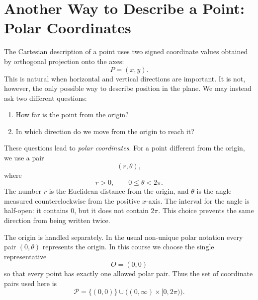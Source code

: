 \section{Another Way to Describe a Point: Polar Coordinates}

The Cartesian description of a point uses two signed coordinate values obtained
by orthogonal projection onto the axes:
\[
P=(x,y).
\]
This is natural when horizontal and vertical directions are important. It is not,
however, the only possible way to describe position in the plane. We may instead
ask two different questions:
\begin{enumerate}
    \item How far is the point from the origin?
    \item In which direction do we move from the origin to reach it?
\end{enumerate}

These questions lead to \emph{polar coordinates}. For a point different from the
origin, we use a pair
\[
(r,\theta),
\]
where
\[
r>0,
\qquad
0\leq \theta<2\pi.
\]
The number $r$ is the Euclidean distance from the origin, and $\theta$ is the
angle measured counterclockwise from the positive $x$-axis. The interval for the
angle is half-open: it contains $0$, but it does not contain $2\pi$. This choice
prevents the same direction from being written twice.

The origin is handled separately. In the usual non-unique polar notation every
pair $(0,\theta)$ represents the origin. In this course we choose the single
representative
\[
O=(0,0)
\]
so that every point has exactly one allowed polar pair. Thus the set of coordinate
pairs used here is
\[
\mathcal{P}
=
\{(0,0)\}
\cup
\bigl((0,\infty)\times[0,2\pi)\bigr).
\]

\begin{center}
\end{center}

